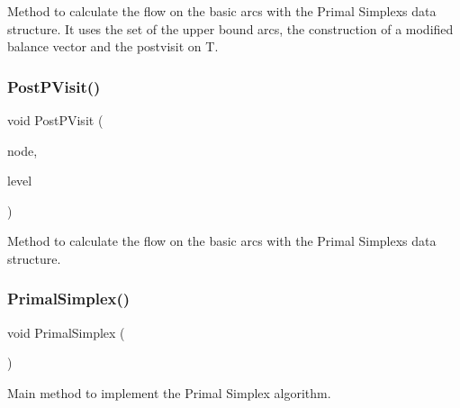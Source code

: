 Method to calculate the flow on the basic arcs with the Primal Simplex\textquotesingle{}s data structure. It uses the set of the upper bound arcs, the construction of a modified balance vector and the postvisit on T. \mbox{\label{class_m_c_f_simplex_a83dcee84696fcb76852de9336170e24c}} 
\subsubsection{\texorpdfstring{Post\+P\+Visit()}{PostPVisit()}\hspace{0.1cm}{\footnotesize\ttfamily [2/2]}}
{\footnotesize\ttfamily void Post\+P\+Visit (\begin{DoxyParamCaption}\item[{\mbox{\hyperlink{struct_m_c_f_simplex_1_1node_p_type}{node\+P\+Type}} $\ast$}]{node,  }\item[{int}]{level }\end{DoxyParamCaption})\hspace{0.3cm}{\ttfamily [private]}}

Method to calculate the flow on the basic arcs with the Primal Simplex\textquotesingle{}s data structure. \mbox{\label{class_m_c_f_simplex_a93cdea00618b8e60410dc46c14480016}} 
\subsubsection{\texorpdfstring{Primal\+Simplex()}{PrimalSimplex()}}
{\footnotesize\ttfamily void Primal\+Simplex (\begin{DoxyParamCaption}\item[{void}]{ }\end{DoxyParamCaption})\hspace{0.3cm}{\ttfamily [private]}}

Main method to implement the Primal Simplex algorithm. \mbox{\label{class_m_c_f_simplex_a7852f297fc43c2304256e63ce40fd71b}} 
